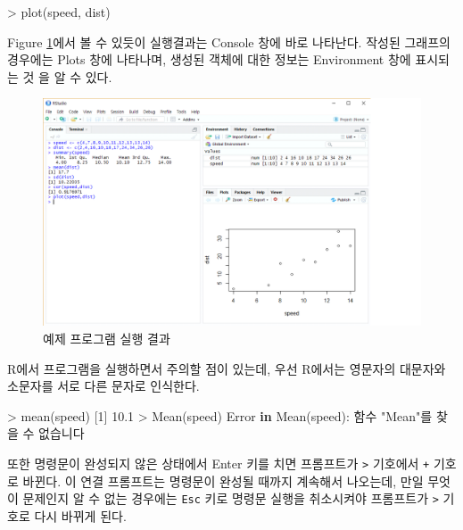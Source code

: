 \documentclass[
]{book}
\newenvironment{Shaded}{\begin{snugshade}}{\end{snugshade}}
\newcommand{\ControlFlowTok}[1]{\textcolor[rgb]{0.13,0.29,0.53}{\textbf{#1}}}
\newcommand{\DecValTok}[1]{\textcolor[rgb]{0.00,0.00,0.81}{#1}}
\newcommand{\FloatTok}[1]{\textcolor[rgb]{0.00,0.00,0.81}{#1}}
\newcommand{\FunctionTok}[1]{\textcolor[rgb]{0.00,0.00,0.00}{#1}}
\newcommand{\NormalTok}[1]{#1}
\newcommand{\SpecialCharTok}[1]{\textcolor[rgb]{0.00,0.00,0.00}{#1}}
\newcommand{\StringTok}[1]{\textcolor[rgb]{0.31,0.60,0.02}{#1}}
\begin{document}
\begin{Shaded}
\begin{Highlighting}[]
\SpecialCharTok{\textgreater{}} \FunctionTok{plot}\NormalTok{(speed, dist)}
\end{Highlighting}
\end{Shaded}

Figure \ref{fig:exresult}에서 볼 수 있듯이 실행결과는 Console 창에 바로
나타난다. 작성된 그래프의 경우에는 Plots 창에 나타나며, 생성된 객체에
대한 정보는 Environment 창에 표시되는 것 을 알 수 있다.

\begin{figure}
\includegraphics[width=16in]{Figure/ex_result} \caption{예제 프로그램 실행 결과}\label{fig:exresult}
\end{figure}

R에서 프로그램을 실행하면서 주의할 점이 있는데, 우선 R에서는 영문자의
대문자와 소문자를 서로 다른 문자로 인식한다.

\begin{Shaded}
\begin{Highlighting}[]
\SpecialCharTok{\textgreater{}} \FunctionTok{mean}\NormalTok{(speed)}
\NormalTok{[}\DecValTok{1}\NormalTok{] }\FloatTok{10.1}
\SpecialCharTok{\textgreater{}} \FunctionTok{Mean}\NormalTok{(speed)}
\NormalTok{Error }\ControlFlowTok{in} \FunctionTok{Mean}\NormalTok{(speed)}\SpecialCharTok{:}\NormalTok{ 함수 }\StringTok{"Mean"}\NormalTok{를 찾을 수 없습니다}
\end{Highlighting}
\end{Shaded}

또한 명령문이 완성되지 않은 상태에서 Enter 키를 치면 프롬프트가 \texttt{\textgreater{}}
기호에서 \texttt{+} 기호로 바뀐다. 이 연결 프롬프트는 명령문이 완성될 때까지
계속해서 나오는데, 만일 무엇이 문제인지 알 수 없는 경우에는 \texttt{Esc} 키로
명령문 실행을 취소시켜야 프롬프트가 \texttt{\textgreater{}} 기호로 다시 바뀌게 된다.
\end{document}

